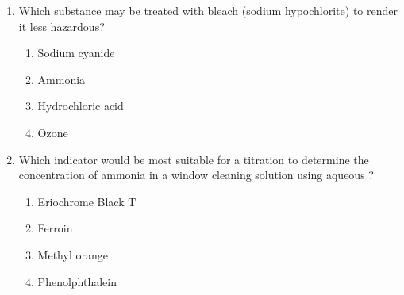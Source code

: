 \documentclass[twocolumn, 10pt]{article}
\begin{document}
\begin{enumerate}
\begin{center}
    \end{center}
    \begin{enumerate}
        \item (A)
        \item (B)
        \item (C)
        \item (D)
    \end{enumerate}

    \item Which substance may be treated with bleach (sodium hypochlorite) to render it less hazardous?
    \begin{enumerate}
        \item Sodium cyanide
        \item Ammonia
        \item Hydrochloric acid
        \item Ozone
    \end{enumerate}

    \item Which indicator would be most suitable for a titration to determine the concentration of ammonia in a window cleaning solution using aqueous ?
    \begin{enumerate}
        \item Eriochrome Black T
        \item Ferroin
        \item Methyl orange
        \item Phenolphthalein
    \end{enumerate}


\end{enumerate}
\end{document}
